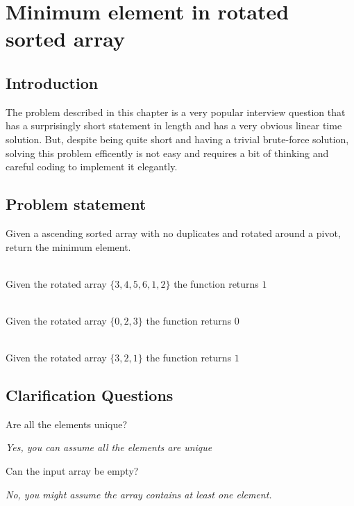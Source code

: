 %

\chapter{Minimum element in rotated sorted array}
\label{ch:min_rotated_array}
\section*{Introduction}
The problem described in this chapter is a very popular interview question that has a surprisingly short statement in length and has a very obvious linear time solution. But, despite being quite short and having a trivial  brute-force solution, solving this problem efficently is not easy and requires a bit of thinking and careful coding to implement it elegantly. 

\section{Problem statement}
\begin{exercise}
Given a ascending sorted array with no duplicates and rotated around a pivot, return the minimum element.
\end{exercise}


\begin{example}
	\hfill \\
	Given the rotated array $\{3,4,5,6,1,2\}$ the function returns $1$
\end{example}

\begin{example}
	\hfill \\
	Given the rotated array $\{0,2,3\}$ the function returns $0$
\end{example}

\begin{example}
	\hfill \\
	Given the rotated array $\{3,2,1\}$ the function returns $1$
\end{example}

\section{Clarification Questions}

\begin{QandA}
	\item Are all the elements unique? 
	\begin{answered}
		\textit{Yes, you can assume all the elements are unique}
	\end{answered}
	\item Can the input array be empty?
	\begin{answered}
		\textit{No, you might assume the array contains at least one element.}
	\end{answered}
\end{QandA}

